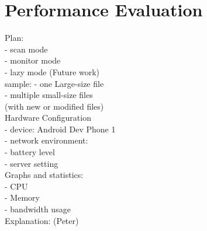 \section{Performance Evaluation}
\label{sec:Performance}
Plan:\\
	- scan mode\\
	- monitor mode\\
	- lazy mode (Future work)\\
	
	sample:	
		- one Large-size file\\
		- multiple small-size files\\
		(with new or modified files)\\
		
Hardware Configuration\\
	- device: Android Dev Phone 1\\
	- network environment:\\
	- battery level\\
	- server setting\\

Graphs and statistics:\\ 
	- CPU\\
	- Memory\\
	- bandwidth usage\\

Explanation:  (Peter)\\